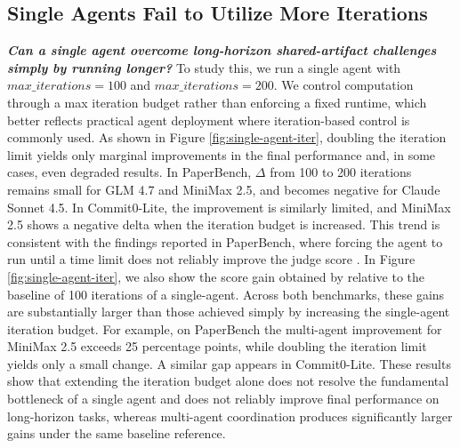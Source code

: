 \subsection{Single Agents Fail to Utilize More Iterations}

\textbf{\textit{Can a single agent overcome long-horizon shared-artifact challenges simply by running longer?}} 
To study this, we run a single agent with $max\_iterations=100$ and $max\_iterations=200$. We control computation through a max iteration budget rather than enforcing a fixed runtime, which better reflects practical agent deployment where iteration-based control is commonly used. As shown in Figure \ref{fig:single-agent-iter}, doubling the iteration limit yields only marginal improvements in the final performance and, in some cases, even degraded results. In PaperBench, $\Delta$ from 100 to 200 iterations remains small for GLM 4.7 and MiniMax 2.5, and becomes negative for Claude Sonnet 4.5. In Commit0-Lite, the improvement is similarly limited, and MiniMax 2.5 shows a negative delta when the iteration budget is increased. This trend is consistent with the findings reported in PaperBench, where forcing the agent to run until a time limit does not reliably improve the judge score \citep{starace2025paperbench}. In Figure \ref{fig:single-agent-iter}, we also show the score gain obtained by \ourmethod relative to the baseline of 100 iterations of a single-agent. Across both benchmarks, these gains are substantially larger than those achieved simply by increasing the single-agent iteration budget. For example, on PaperBench the multi-agent improvement for MiniMax 2.5 exceeds 25 percentage points, while doubling the iteration limit yields only a small change. A similar gap appears in Commit0-Lite. These results show that extending the iteration budget alone does not resolve the fundamental bottleneck of a single agent and does not reliably improve final performance on long-horizon tasks, whereas multi-agent coordination produces significantly larger gains under the same baseline reference.


